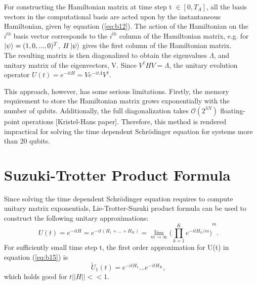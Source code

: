 \documentclass[12]{article}
\begin{document}
For constructing the Hamiltonian matrix at time step t $\in [0,T_A]$, all the basis vectors in the computational basis are acted upon by the instantaneous Hamiltonian, given by equation (\ref{eq:b12}). The action of the Hamiltonian on the $i^{th}$ basis vector corresponds to the $i^{th}$ column of the Hamiltonian matrix, e.g. for $\ket{\psi}=(1,0,...,0)^T$, $H\ket{\psi}$ gives the first column of the Hamiltonian matrix. \\
The resulting matrix is then diagonalized to obtain the eigenvalues $\Lambda$, and unitary matrix of the eigenvectors, V. Since $V^{\dagger}HV=\Lambda$, the unitary evolution operator $U(t)=e^{-itH}=Ve^{-it\Lambda}V^{\dagger}$.


This approach, however, has some serious limitations. Firstly, the memory requirement to store the Hamiltonian matrix grows exponentially with the number of qubits. Additionally, the full diagonalization takes $\mathcal{O}(2^{3N})$ floating-point operations [Kristel-Hans paper]. Therefore, this method is rendered impractical for solving the time dependent Schr{\"o}dinger equation for systems more than 20 qubits.

\section{Suzuki-Trotter Product Formula} 
Since solving the time dependent Schr{\"o}dinger equation requires to compute unitary matrix exponentials, Lie-Trotter-Suzuki product formula can be used to construct the following unitary approximations:
\begin{equation}
U(t)= e^{-itH}= e^{-it(H_1+...+H_K)}= \lim\limits_{m \to \infty} {\bigg(\prod_{k=1}^{K}e^{-itH_k/m} \bigg)}^m.    \label{eq:b15}
\end{equation}
For sufficiently small time step t, the first order approximation for U(t) in equation (\ref{eq:b15}) is
\begin{equation}
\tilde{U}_1(t)=e^{-itH_1}...e^{-itH_K},    \label{eq:b16}
\end{equation}
which holds good for $t \left| \left| H \right| \right| << 1$.
\end{document}
